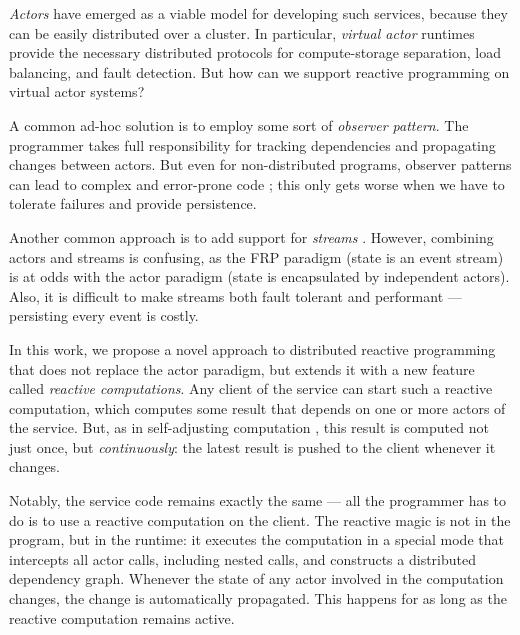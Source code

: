 \emph{Actors} have emerged as a viable model for developing such services, because they can be easily distributed over a cluster. In particular, \emph{virtual actor} runtimes provide the necessary distributed protocols for compute-storage separation, load balancing, and fault detection. But how can we support reactive programming on virtual actor systems?
 
A common ad-hoc solution is to employ some sort of \emph{observer pattern}. The programmer takes full responsibility for tracking dependencies and propagating changes between actors. But even for non-distributed programs, observer patterns can lead to complex and error-prone code \cite{sobserver}; this only gets worse when we have to tolerate failures and provide persistence. 

Another common approach is to add support for \emph{streams} \cite{}. However, combining actors and streams is confusing, as the FRP paradigm (state is an event stream) is at odds with the actor paradigm (state is encapsulated by independent actors). Also, it is difficult to make streams both fault tolerant and performant ---  persisting every event is costly. 

 In this work, we propose a novel approach to distributed reactive programming that does not replace the actor paradigm, but extends it with a new feature called \emph{reactive computations}. Any client of the service can start such a reactive computation, which computes some result that depends on one or more actors of the service. But, as in self-adjusting computation \cite{Acar:SelfAdjustingOverview}, this result is computed not just once, but \emph{continuously}: the latest result is pushed to the client whenever it changes. 

Notably, the service code remains exactly the same ---  all the programmer has to do is to use a reactive computation on the client.  The reactive magic is not in the program, but in the runtime: it executes the computation in a special mode that intercepts all actor calls, including nested calls, and constructs a distributed dependency graph. Whenever the state of any actor involved in the computation changes, the change is automatically  propagated. This happens for as long as the reactive computation remains active. 


